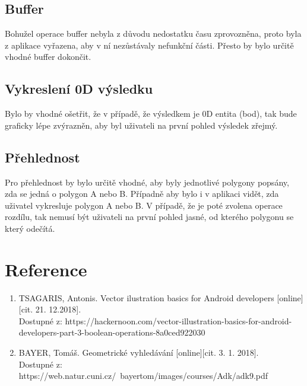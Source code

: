 \documentclass[a4paper, 12pt]{article}
\begin{document}
\subsection{Buffer}
Bohužel operace buffer nebyla z důvodu nedostatku času zprovozněna, proto byla z aplikace vyřazena, aby v ní nezůstávaly nefunkční části. Přesto by bylo určitě vhodné buffer dokončit. 

\subsection{Vykreslení 0D výsledku}
Bylo by vhodné ošetřit, že v případě, že výsledkem je 0D entita (bod), tak bude graficky lépe zvýrazněn, aby byl uživateli na první pohled výsledek zřejmý.

\subsection{Přehlednost}
Pro přehlednost by bylo určitě vhodné, aby byly jednotlivé polygony popsány, zda se jedná o polygon A nebo B. Případně aby bylo i v aplikaci vidět, zda uživatel vykresluje polygon A nebo B. V případě, že je poté zvolena operace rozdílu, tak nemusí být uživateli na první pohled jasné, od kterého polygonu se který odečítá.



\clearpage
\section{Reference}

\begin{enumerate}
\item TSAGARIS, Antonis. Vector ilustration basics for Android developers [online][cit. 21. 12.2018]. \\
Dostupné z: https://hackernoon.com/vector-illustration-basics-for-android-developers-part-3-boolean-operations-8a0ced922030 \\

\item  BAYER, Tomáš. Geometrické vyhledávání [online][cit. 3. 1. 2018]. \\
Dostupné z: https://web.natur.cuni.cz/~bayertom/images/courses/Adk/adk9.pdf  \\


\end{enumerate}
\end{document}
